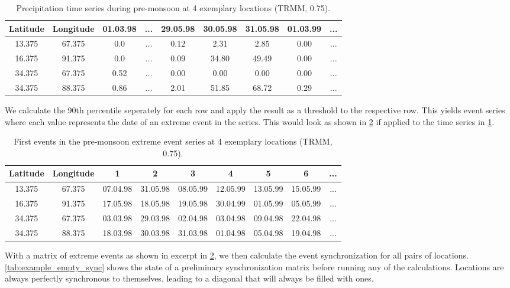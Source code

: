 \begin{table}[h]
  \centering
  \begin{tabular}{ |c|c|ccccccc| }
    \hline
    Latitude & Longitude & 01.03.98 & ... & 29.05.98 & 30.05.98 & 31.05.98 & 01.03.99 & ...\\
    \hline
    13.375 & 67.375 & 0.0  & ... & 0.12 & 2.31  & 2.85  & 0.00 & ... \\
    16.375 & 91.375 & 0.0  & ... & 0.09 & 34.80 & 49.49 & 0.00 & ... \\
    34.375 & 67.375 & 0.52 & ... & 0.00 & 0.00  & 0.00  & 0.00 & ... \\
    34.375 & 88.375 & 0.86 & ... & 2.01 & 51.85 & 68.72 & 0.29 & ... \\
    \hline
  \end{tabular}
  \caption{Precipitation time series during pre-monsoon at 4 exemplary locations (TRMM, 0.75\degree).}
  \label{tab:example_rainfall_ts}
\end{table}

We calculate the 90th percentile seperately for each row and apply the result as a threshold to the respective row. This yields event series where each value represents the date of an extreme event in the series. This would look as shown in \cref{tab:example_rainfall_events} if applied to the time series in \cref{tab:example_rainfall_ts}.

\begin{table}[h]
  \centering
  \begin{tabular}{ |c|c|ccccccc| }
    \hline
    Latitude & Longitude & 1 & 2 & 3 & 4 & 5 & 6 & ... \\
    \hline
    13.375 & 67.375 & 07.04.98 & 31.05.98 & 08.05.99 & 12.05.99 & 13.05.99 & 15.05.99 & ... \\
    16.375 & 91.375 & 17.05.98 & 18.05.98 & 19.05.98 & 30.04.99 & 01.05.99 & 05.05.99 & ... \\
    34.375 & 67.375 & 03.03.98 & 29.03.98 & 02.04.98 & 03.04.98 & 09.04.98 & 22.04.98 & ... \\
    34.375 & 88.375 & 18.03.98 & 30.03.98 & 31.03.98 & 01.04.98 & 05.04.98 & 19.04.98 & ... \\
    \hline
  \end{tabular}
  \caption{First events in the pre-monsoon extreme event series at 4 exemplary locations (TRMM, 0.75\degree).}
  \label{tab:example_rainfall_events}
\end{table}

With a matrix of extreme events as shown in excerpt in \cref{tab:example_rainfall_events}, we then calculate the event synchronization for all pairs of locations. \cref{tab:example_empty_sync} shows the state of a preliminary synchronization matrix before running any of the calculations. Locations are always perfectly synchronous to themselves, leading to a diagonal that will always be filled with ones.

